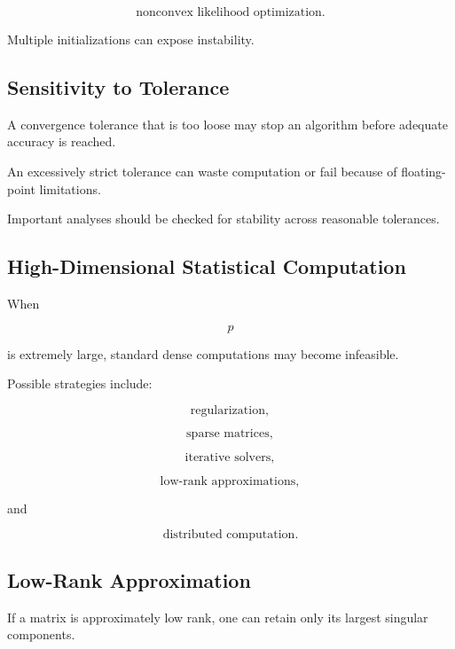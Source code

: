 \[
\boxed{
\text{nonconvex likelihood optimization}.
}
\]

Multiple initializations can expose instability.

\subsection{Sensitivity to Tolerance}
\label{subsec:sensitivity-tolerance}

A convergence tolerance that is too loose may stop an algorithm before
adequate accuracy is reached.

An excessively strict tolerance can waste computation or fail because of
floating-point limitations.

Important analyses should be checked for stability across reasonable
tolerances.

\subsection{High-Dimensional Statistical Computation}
\label{subsec:high-dimensional-statistical-computation}

When

\[
p
\]

is extremely large, standard dense computations may become infeasible.

Possible strategies include:

\[
\boxed{
\text{regularization},
}
\]

\[
\boxed{
\text{sparse matrices},
}
\]

\[
\boxed{
\text{iterative solvers},
}
\]

\[
\boxed{
\text{low-rank approximations},
}
\]

and

\[
\boxed{
\text{distributed computation}.
}
\]

\subsection{Low-Rank Approximation}
\label{subsec:low-rank-approximation-statistics}

If a matrix is approximately low rank, one can retain only its largest
singular components.

